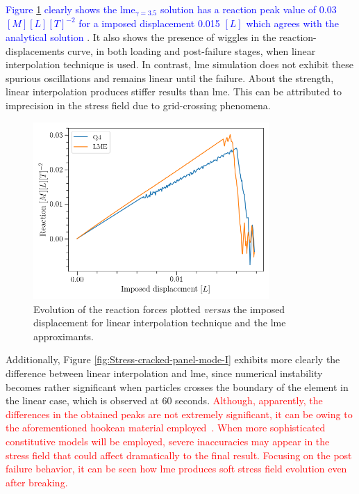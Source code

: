 \message{ !name(2020_EFM_MPM_Eigensoftening.tex)}\documentclass[preprint,12pt,a4paper]{elsarticle}
\newcommand{\PNA}[1]{
  \textcolor{red}{{#1}}
}
\newcommand{\MMP}[1]{
  \textcolor{blue}{{#1}}
}
\begin{document}
\MMP{Figure \ref{fig:Reactions-cracked-panel-mode-I} clearly shows the
\acrshort{lme}$_{\gamma = 3.5}$ solution has a reaction peak value of 0.03 $[M] [L]
[T]^{-2}$ for a imposed displacement 0.015 $[L]$ which agrees with the
analytical solution \cite{Pandolfi_2012}}. It also shows the presence
of wiggles in the reaction-displacements curve, in both loading and
post-failure stages, when linear interpolation technique is used. In
contrast, \acrshort{lme} simulation does not exhibit these spurious
oscillations and remains linear until the failure. About the strength,
linear interpolation produces stiffer results than
\acrshort{lme}. This can be attributed to imprecision in the stress
field due to grid-crossing phenomena.\\
\begin{figure}
  \centering
  \includegraphics[width=0.8\textwidth]{Figure-Reactions-Mode-I}
  \caption{Evolution of the reaction forces plotted \textit{versus}
    the imposed displacement for linear interpolation technique and
    the \acrshort{lme} approximants.}
  \label{fig:Reactions-cracked-panel-mode-I}
\end{figure}
Additionally, Figure \ref{fig:Stress-cracked-panel-mode-I}
exhibits more clearly the difference between linear interpolation and
\acrshort{lme}, since numerical instability becomes rather significant
when particles crosses the boundary of the element in the linear
case, which is observed at 60 seconds. \PNA{Although, apparently, the
  differences in the obtained peaks are not extremely significant, it
  can be owing to the aforementioned hookean material
  employed~\cite{Zhang_EE_2020}. When more sophisticated constitutive
  models will be employed, severe inaccuracies may appear in the
  stress field that could affect dramatically to the final 
  result. Focusing on the post failure behavior, it can be seen how
  \acrshort{lme} produces soft stress field evolution even after
  breaking.} 
\end{document}
